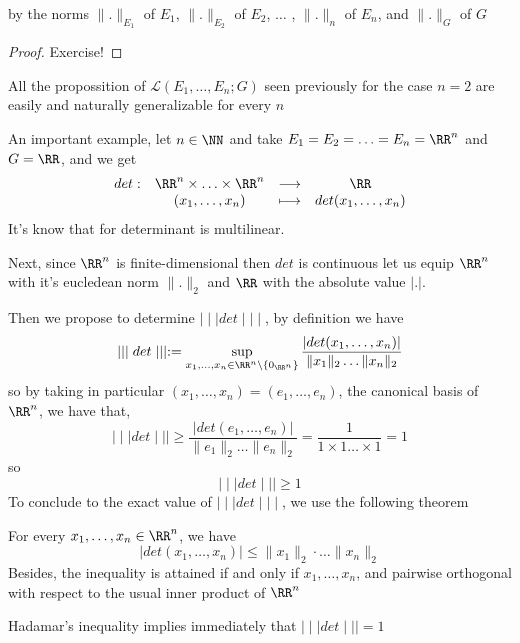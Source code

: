 by the norms $\| . \| _{E_1} $  of $E_1 $, 
$\| . \| _{E_2} $  of $E_2 $, $\hdots$ , $\| . \| _n   $ of $E_n  $, and 
$\| . \| _{G} $  of $G$ 
\begin{proof}
Exercise!
\end{proof}
\begin{remark}[]
	All the propossition of $\mathcal{L} (
	E_1, \hdots , E_n;G )  $ seen previously 
	for the case $n = 2 $ are easily and naturally
	generalizable for every $n$ 
\end{remark}
An important example, let $n \in \NN $  and take 
$E_1 = E_2= \hdots = E_n = \RR ^n  $ and $G =\RR  $, 
and we get 
\[
\begin{array}{cccc}
      det : &  \RR ^n  \times \hdots \times \RR ^n     & \longrightarrow & \RR  \\

           &    (x_1, \hdots , x_{n}) & \longmapsto     & det
	   (x_1, \hdots , x_{n}) \\ 
\end{array}
\]
It's know that for determinant is multilinear.

Next, since $\RR ^n  $ is finite-dimensional then $det $ is continuous 
let us equip $\RR ^n  $ with it's eucledean norm $\| . \|_{2} $ 
and $\RR  $ with the absolute value $\left| . \right| $.

Then we propose to determine $\mid \mid \mid  det \mid \mid \mid  $, 
by definition we have
\[
\mid \mid \mid  det \mid \mid \mid  :=
\sup_{x_1, \hdots , x_{n} \in \RR ^n  \backslash \left\{ 0_{\RR ^n }\right\}} 
\frac{\left| det(x_1, \hdots , x_{n} )  \right|}{ \| x_1 \| _{2} \hdots 
\| x_n  \| _{2}}
\]
so by taking in particular $\left( x_1, \hdots , x_{n} \right) = 
\left( e_1, \hdots , e _n  \right)$, the canonical basis of $\RR ^n  $, 
we have that,
\[
	\mid \mid \mid  det \mid \mid \mid  \geq 
	\frac{\left| det(e_1, \hdots , e _n )  \right|}{ 
	\| e_1 \| _{2} \hdots \| e_{n} \| _{2}} = 
	\frac{1}{1 \times 1 \hdots  \times 1  } = 
	1
\]
so 
\[
\mid \mid \mid  det \mid \mid \mid  \geq 1
\]
To conclude to the exact value of 
$\mid \mid \mid  det \mid \mid \mid  $, we use the following theorem
\divider
\begin{theorem}
	For every $x_1, \hdots ,x_n  \in \RR ^n  $, we have 
	\[
	\left| det(x_1, \hdots , x_{n})  \right| 
	\leq \| x_1 \| _{2} \cdot \hdots  \| x _n  \| _{2}
	\]
	Besides, the inequality is attained if and only if 
	$x_1, \hdots , x_n  $, and pairwise orthogonal 
	with respect to the usual inner product of 
	$\RR ^n  $
\end{theorem}
\divider
Hadamar's inequality implies 
immediately that $\mid \mid \mid  det \mid \mid \mid = 1 $


